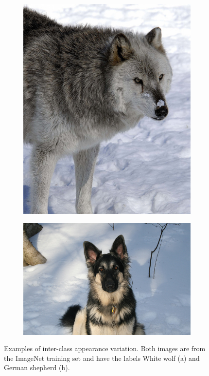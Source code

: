 \begin{figure}[H]
    \centering
    \begin{subfigure}[b]{0.3\textwidth}
        \center
        \includegraphics[width=\textwidth]{Figs/Problem/wolf.jpeg}
        \caption{}\label{fig:inter2a}
    \end{subfigure}
    \begin{subfigure}[b]{0.45\textwidth}
        \center
        \includegraphics[width=\textwidth]{Figs/Problem/germanshepherd.jpeg}
        \caption{}\label{fig:inter2b}
    \end{subfigure}
    \caption{Examples of inter-class appearance variation. Both images are from the ImageNet training set \cite{imagenet} and have the labels White wolf (a) and German shepherd (b).}
    \label{fig:inter2}
\end{figure} 

